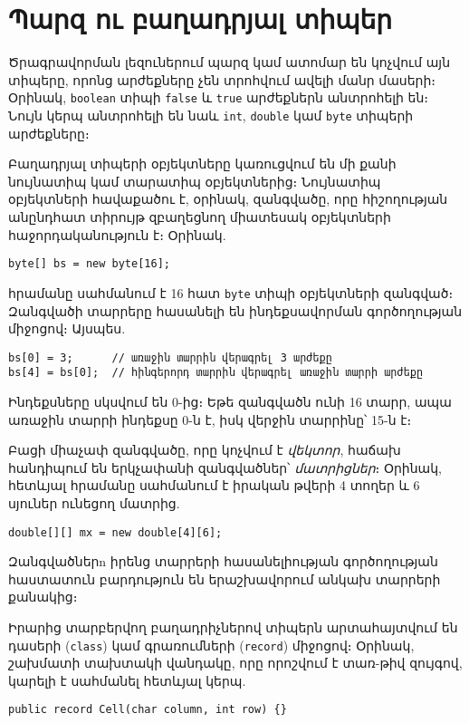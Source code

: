 %
%
%
\chapter{Պարզ ու բաղադրյալ տիպեր}

Ծրագրավորման լեզուներում պարզ կամ ատոմար են կոչվում այն տիպերը, որոնց
արժեքները չեն տրոհվում ավելի մանր մասերի։ Օրինակ, \texttt{boolean} տիպի
\texttt{false} և \texttt{true} արժեքներն անտրոհելի են։ Նույն կերպ անտրոհելի
են նաև \texttt{int}, \texttt{double} կամ \texttt{byte} տիպերի արժեքները։

Բաղադրյալ տիպերի օբյեկտները կառուցվում են մի քանի նույնատիպ կամ տարատիպ
օբյեկտներից։ Նույնատիպ օբյեկտների հավաքածու է, օրինակ, զանգվածը, որը
հիշողության անընդհատ տիրույթ զբաղեցնող միատեսակ օբյեկտների հաջորդականություն
է։ Օրինակ.

\begin{verbatim}
byte[] bs = new byte[16];
\end{verbatim}

\noindent հրամանը սահմանում է 16 հատ \texttt{byte} տիպի օբյեկտների
զանգված։ Զանգվածի տարրերը հասանելի են ինդեքսավորման գործողության միջոցով։
Այսպես.

\begin{verbatim}
bs[0] = 3;      // առաջին տարրին վերագրել 3 արժեքը
bs[4] = bs[0];  // հինգերորդ տարրին վերագրել առաջին տարրի արժեքը
\end{verbatim}

Ինդեքսները սկսվում են 0-ից։ Եթե զանգվածն ունի 16 տարր, ապա առաջին տարրի
ինդեքսը 0-ն է, իսկ վերջին տարրինը՝ 15-ն է։

Բացի միաչափ զանգվածը, որը կոչվում է \emph{վեկտոր}, հաճախ հանդիպում են
երկչափանի զանգվածներ՝ \emph{մատրիցներ}։ Օրինակ, հետևյալ հրամանը սահմանում
է իրական թվերի 4 տողեր և 6 սյուներ ունեցող մատրից.

\begin{verbatim}
double[][] mx = new double[4][6];
\end{verbatim}

Զանգվածներn իրենց տարրերի հասանելիության գործողության հաստատուն բարդություն
են երաշխավորում անկախ տարրերի քանակից։

Իրարից տարբերվող բաղադրիչներով տիպերն արտահայտվում են դասերի (\texttt{class})
կամ գրառումների (\texttt{record}) միջոցով։ Օրինակ, շախմատի տախտակի վանդակը,
որը որոշվում է տառ-թիվ զույգով, կարելի է սահմանել հետևյալ կերպ.

\begin{verbatim}
public record Cell(char column, int row) {}
\end{verbatim}
